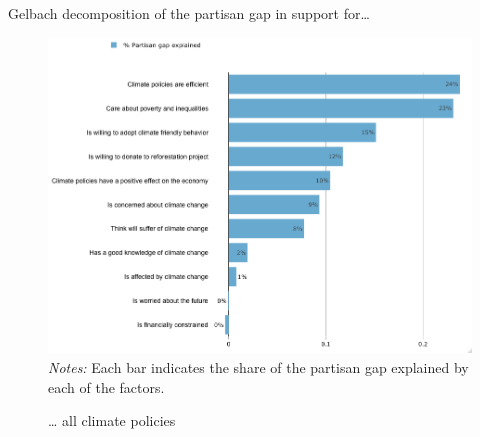 \begin{frame}{Gelbach decomposition of the partisan gap in support for…}%
\vspace{-.2cm}
\begin{figure}[h!]
\caption{… all climate policies}
\includegraphics[width=.55\textwidth]{../../figures/Gelbach/gelbach_right_all_policies_D2SD} \\
{\tiny \textit{Notes:} Each bar indicates the share of the partisan gap explained by each of the factors.}
\end{figure}
\end{frame}

